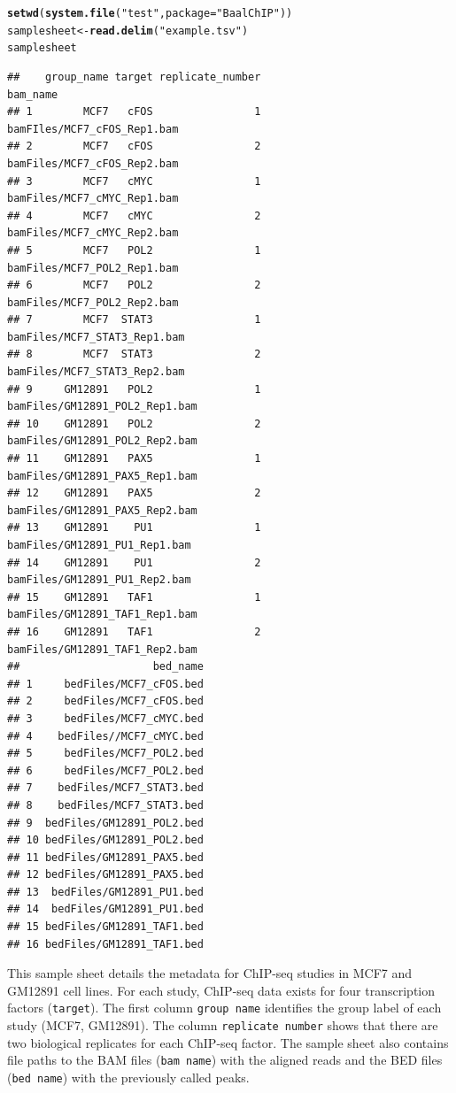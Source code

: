 \documentclass{article}\usepackage[]{graphicx}\usepackage[usenames,dvipsnames]{color}
\makeatletter
\newcommand{\hlstr}[1]{\textcolor[rgb]{0.192,0.494,0.8}{#1}}%
\newcommand{\hlstd}[1]{\textcolor[rgb]{0.345,0.345,0.345}{#1}}%
\newcommand{\hlkwb}[1]{\textcolor[rgb]{0.69,0.353,0.396}{#1}}%
\newcommand{\hlkwc}[1]{\textcolor[rgb]{0.333,0.667,0.333}{#1}}%
\newcommand{\hlkwd}[1]{\textcolor[rgb]{0.737,0.353,0.396}{\textbf{#1}}}%
\newenvironment{kframe}{%
 \def\at@end@of@kframe{}%
 \ifinner\ifhmode%
  \def\at@end@of@kframe{\end{minipage}}%
  \begin{minipage}{\columnwidth}%
 \fi\fi%
 \def\FrameCommand##1{\hskip\@totalleftmargin \hskip-\fboxsep
 \colorbox{shadecolor}{##1}\hskip-\fboxsep
     \hskip-\linewidth \hskip-\@totalleftmargin \hskip\columnwidth}%
 \MakeFramed {\advance\hsize-\width
   \@totalleftmargin\z@ \linewidth\hsize
   \@setminipage}}%
 {\par\unskip\endMakeFramed%
 \at@end@of@kframe}
\newenvironment{knitrout}{}{} %
\makeatother
\begin{document}
\begin{knitrout}
\color{fgcolor}\begin{kframe}
\begin{alltt}
\hlkwd{setwd}\hlstd{(}\hlkwd{system.file}\hlstd{(}\hlstr{"test"}\hlstd{,}\hlkwc{package}\hlstd{=}\hlstr{"BaalChIP"}\hlstd{))}
\hlstd{samplesheet} \hlkwb{<-} \hlkwd{read.delim}\hlstd{(}\hlstr{"example.tsv"}\hlstd{)}
\hlstd{samplesheet}
\end{alltt}
\begin{verbatim}
##    group_name target replicate_number                       bam_name
## 1        MCF7   cFOS                1    bamFIles/MCF7_cFOS_Rep1.bam
## 2        MCF7   cFOS                2    bamFiles/MCF7_cFOS_Rep2.bam
## 3        MCF7   cMYC                1    bamFiles/MCF7_cMYC_Rep1.bam
## 4        MCF7   cMYC                2    bamFiles/MCF7_cMYC_Rep2.bam
## 5        MCF7   POL2                1    bamFiles/MCF7_POL2_Rep1.bam
## 6        MCF7   POL2                2    bamFiles/MCF7_POL2_Rep2.bam
## 7        MCF7  STAT3                1   bamFiles/MCF7_STAT3_Rep1.bam
## 8        MCF7  STAT3                2   bamFiles/MCF7_STAT3_Rep2.bam
## 9     GM12891   POL2                1 bamFiles/GM12891_POL2_Rep1.bam
## 10    GM12891   POL2                2 bamFiles/GM12891_POL2_Rep2.bam
## 11    GM12891   PAX5                1 bamFiles/GM12891_PAX5_Rep1.bam
## 12    GM12891   PAX5                2 bamFiles/GM12891_PAX5_Rep2.bam
## 13    GM12891    PU1                1  bamFiles/GM12891_PU1_Rep1.bam
## 14    GM12891    PU1                2  bamFiles/GM12891_PU1_Rep2.bam
## 15    GM12891   TAF1                1 bamFiles/GM12891_TAF1_Rep1.bam
## 16    GM12891   TAF1                2 bamFiles/GM12891_TAF1_Rep2.bam
##                     bed_name
## 1     bedFiles/MCF7_cFOS.bed
## 2     bedFiles/MCF7_cFOS.bed
## 3     bedFiles/MCF7_cMYC.bed
## 4    bedFiles//MCF7_cMYC.bed
## 5     bedFiles/MCF7_POL2.bed
## 6     bedFiles/MCF7_POL2.bed
## 7    bedFiles/MCF7_STAT3.bed
## 8    bedFiles/MCF7_STAT3.bed
## 9  bedFiles/GM12891_POL2.bed
## 10 bedFiles/GM12891_POL2.bed
## 11 bedFiles/GM12891_PAX5.bed
## 12 bedFiles/GM12891_PAX5.bed
## 13  bedFiles/GM12891_PU1.bed
## 14  bedFiles/GM12891_PU1.bed
## 15 bedFiles/GM12891_TAF1.bed
## 16 bedFiles/GM12891_TAF1.bed
\end{verbatim}
\end{kframe}
\end{knitrout}

This sample sheet details the metadata for ChIP-seq studies in MCF7 and GM12891 cell lines. For each study, ChIP-seq data exists for four transcription factors (\texttt{target}). The first column \texttt{group name} identifies the group label of each study (MCF7, GM12891). The column \texttt{replicate number} shows that there are two biological replicates for each ChIP-seq factor. The sample sheet also contains file paths to the BAM files (\texttt{bam name}) with the aligned reads and the BED files (\texttt{bed name}) with the previously called peaks. 
\end{document}
